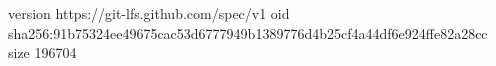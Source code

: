version https://git-lfs.github.com/spec/v1
oid sha256:91b75324ee49675cac53d6777949b1389776d4b25cf4a44df6e924ffe82a28cc
size 196704
